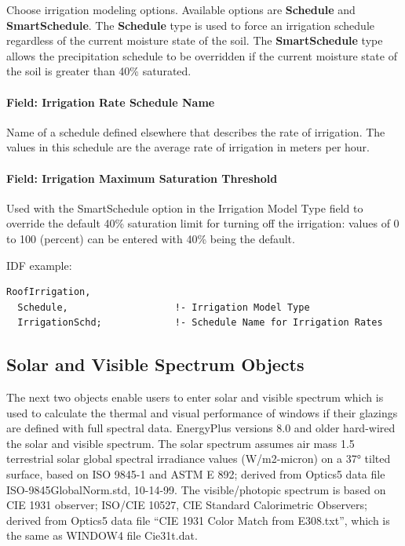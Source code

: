 Choose irrigation modeling options. Available options are \textbf{Schedule} and \textbf{SmartSchedule}. The \textbf{Schedule} type is used to force an irrigation schedule regardless of the current moisture state of the soil. The \textbf{SmartSchedule} type allows the precipitation schedule to be overridden if the current moisture state of the soil is greater than 40\% saturated.

\paragraph{Field: Irrigation Rate Schedule Name}\label{field-irrigation-rate-schedule-name}

Name of a schedule defined elsewhere that describes the rate of irrigation. The values in this schedule are the average rate of irrigation in meters per hour.

\paragraph{Field: Irrigation Maximum Saturation Threshold}\label{field-irrigation-maximum-saturation-threshold}

Used with the SmartSchedule option in the Irrigation Model Type field to override the default 40\% saturation limit for turning off the irrigation: values of 0 to 100 (percent) can be entered with 40\% being the default.

IDF example:

\begin{lstlisting}
RoofIrrigation,
  Schedule,                   !- Irrigation Model Type
  IrrigationSchd;             !- Schedule Name for Irrigation Rates
\end{lstlisting}

\subsection{Solar and Visible Spectrum Objects}\label{solar-and-visible-spectrum-objects}

The next two objects enable users to enter solar and visible spectrum which is used to calculate the thermal and visual performance of windows if their glazings are defined with full spectral data. EnergyPlus versions 8.0 and older hard-wired the solar and visible spectrum. The solar spectrum assumes air mass 1.5 terrestrial solar global spectral irradiance values (W/m2-micron) on a \ang{37} tilted surface, based on ISO 9845-1 and ASTM E 892; derived from Optics5 data file ISO-9845GlobalNorm.std, 10-14-99. The visible/photopic spectrum is based on CIE 1931 observer; ISO/CIE 10527, CIE Standard Calorimetric Observers; derived from Optics5 data file ``CIE 1931 Color Match from E308.txt'', which is the same as WINDOW4 file Cie31t.dat.

